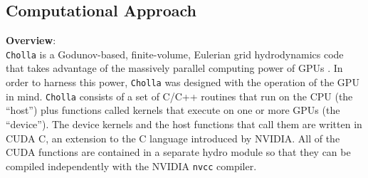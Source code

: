 \documentclass[11pt,letterpaper,english]{article}
\begin{document}
\subsection{Computational Approach}
\vspace{-.2in}




{\bf Overview}:\\
{\tt Cholla} is a Godunov\cite{Godunov59}-based, finite-volume, Eulerian grid hydrodynamics code that takes advantage of the massively parallel computing power of GPUs \cite{Schneider15}. In order to harness this power, {\tt Cholla} was designed with the operation of the GPU in mind. {\tt Cholla} consists of a set of C/C++ routines that run on the CPU 
(the ``host'') plus functions called kernels that execute on one or more GPUs (the ``device''). The device kernels and the host functions that call them are written in CUDA C, an extension to the C language introduced by NVIDIA. All of the CUDA functions are contained in a separate hydro module so that they can be compiled independently with the NVIDIA {\tt nvcc} compiler. %
\end{document}
